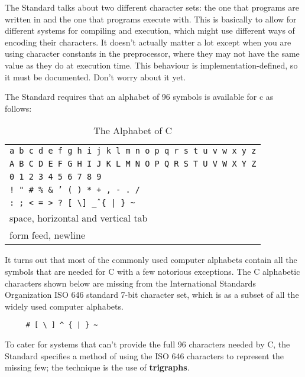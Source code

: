    The Standard talks about two different character sets: the one that
    programs are written in and the one that programs execute with. This is
    basically to allow for different systems for compiling and execution,
    which might use different ways of encoding their characters. It doesn't
    actually matter a lot except when you are using character constants in the
    preprocessor, where they may not have the same value as they do at
    execution time. This behaviour is implementation-defined, so it must be
    documented. Don't worry about it yet.


   The Standard requires that an alphabet of 96 symbols is available
    for c as follows:

    \begin{table}[htb]
      \centering
      \begin{tabular}{p{}}
        \toprule
        \texttt{a b c d e f g h i j k l m n o p q r s t u v w x y z}    \\
        \texttt{A B C D E F G H I J K L M N O P Q R S T U V W X Y Z}    \\
        \texttt{0 1 2 3 4 5 6 7 8 9}    \\
        \texttt{! " \# \% \& ' ( ) * + , - . /}    \\
        \texttt{: ; < = > ? [ \textbackslash ] \^ \_ \{ | \} \~}    \\
        space, horizontal and vertical tab    \\
        form feed, newline    \\
        \bottomrule
      \end{tabular}
      \caption{\label{tab:alphaC}The Alphabet of C}
    \end{table}



   It turns out that most of the commonly used computer alphabets contain
    all the symbols that are needed for C with a few notorious exceptions. The
    C alphabetic characters shown below are missing from the International
    Standards Organization ISO 646 standard 7-bit character set, which is
    as a subset of all the widely used computer alphabets.


   \begin{Verbatim}
     # [ \ ] ^ { | } ~
   \end{Verbatim}

   To cater for systems that can't provide the full 96 characters
    needed by C, the Standard specifies a method of using the
    ISO 646 characters to represent the missing few; the technique is the
    use of \textbf{trigraphs}.


